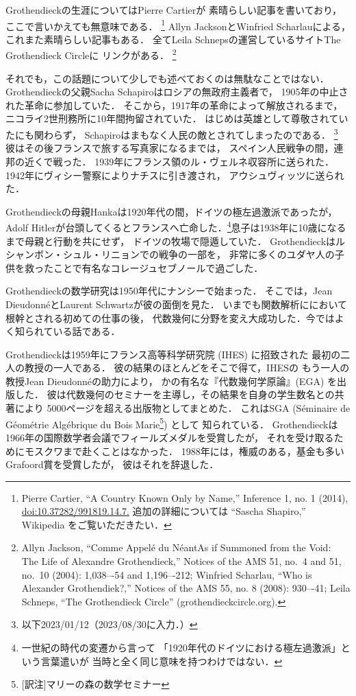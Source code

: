 \documentclass[11pt, a4paper, dvipdfmx]{jlreq}
\theoremstyle{definition}
\theoremstyle{mystyle}
\numberwithin{equation}{section} %
\begin{document}
Grothendieckの生涯についてはPierre Cartierが
素晴らしい記事を書いており，ここで言いかえても無意味である．
\footnote[14]{
    Pierre Cartier, ``A Country Known Only by Name,'' 
    Inference 1, no. 1 (2014), \url{doi:10.37282/991819.14.7.} 
    追加の詳細については “Sascha Shapiro,” Wikipedia をご覧いただきたい．
}
Allyn JacksonとWinfried Scharlauによる，これまた素晴らしい記事もある．
全てLeila Schnepsの運営しているサイトThe Grothendieck Circleに
リンクがある．
\footnote[15]{
    Allyn Jackson, 
    ``Comme Appel\'e du N\'eant\text{---}As if 
    Summoned from the Void: 
    The Life of Alexandre Grothendieck,'' 
    Notices of the AMS 51, no.\ 4 and 51, no.\ 10 (2004): 
    1,038–-54 and 1,196–-212; 
    Winfried Scharlau, ``Who is Alexander Grothendiek?,'' 
    Notices of the AMS 55, no. 8 (2008): 930–-41; 
    Leila Schneps, ``The Grothendieck Circle'' 
    (grothendieckcircle.org).
}

それでも，この話題について少しでも述べておくのは無駄なことではない．
Grothendieckの父親Sacha Schapiroはロシアの無政府主義者で，
1905年の中止された革命に参加していた．
そこから，1917年の革命によって解放されるまで，
ニコライ2世刑務所に10年間拘留されていた．
はじめは英雄として尊敬されていたにも関わらず，
Schapiroはまもなく人民の敵とされてしまったのである．
\footnote{以下2023/01/12（2023/08/30に入力．）}
彼はその後フランスで旅する写真家になるまでは，
スペイン人民戦争の間，連邦の近くで戦った．
1939年にフランス領のル・ヴェルネ収容所に送られた．
1942年にヴィシー警察によりナチスに引き渡され，
アウシュヴィッツに送られた．

Grothendieckの母親Hankaは1920年代の間，ドイツの極左過激派であったが，
Adolf Hitlerが台頭してくるとフランスへ亡命した．\footnote[16]{
    一世紀の時代の変遷から言って
    「1920年代のドイツにおける極左過激派」という言葉遣いが
    当時と全く同じ意味を持つわけではない．
}息子は1938年に10歳になるまで母親と行動を共にせず，
ドイツの牧場で隠遁していた．
Grothendieckはルシャンボン・シュル・リニョンでの戦争の一部を，
非常に多くのユダヤ人の子供を救ったことで有名なコレージュセブノールで過ごした．

Grothendieckの数学研究は1950年代にナンシーで始まった．
そこでは，Jean Dieudonn\'eとLaurent Schwartzが彼の面倒を見た．
いまでも関数解析ににおいて根幹とされる初めての仕事の後，
代数幾何に分野を変え大成功した．今ではよく知られている話である．

Grothendieckは1959年にフランス高等科学研究院 (IHES) に招致された
最初の二人の教授の一人である．
彼の結果のほとんどをそこで得て，IHESの
もう一人の教授Jean Dieudonn\'eの助力により，
かの有名な『代数幾何学原論』(EGA) を出版した．
彼は代数幾何のセミナーを主導し，その結果を自身の学生数名との共著により
5000ページを超える出版物としてまとめた．
これはSGA (S\'eminaire de G\'eom\'etrie Alg\'ebrique 
du Bois Marie\footnote{[訳注]マリーの森の数学セミナー}) として
知られている．
Grothendieckは1966年の国際数学者会議でフィールズメダルを受賞したが，
それを受け取るためにモスクワまで赴くことはなかった．
1988年には，権威のある，基金も多いGrafoord賞を受賞したが，
彼はそれを辞退した．
\end{document}

